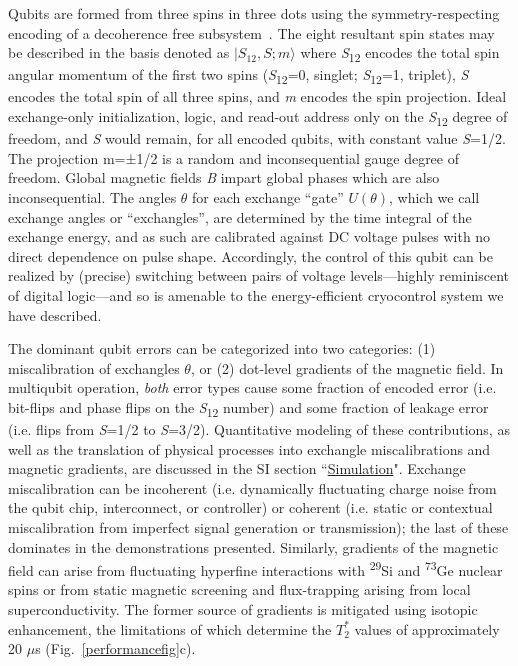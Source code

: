 \documentclass[aps,prl,twocolumn,superscriptaddress,nobibnotes,10pt,floatfix]{revtex4-2}
\newcommand{\figsubref}[2]{Fig.~\ref{#1}{#2}}
\begin{document}
	Qubits are formed from three spins in three dots using the symmetry-respecting encoding of a decoherence free subsystem~\cite{bacon_universal_2000,
		divincenzo_universal_2000,
		fong_universal_2011,
		langrock_reset-if-leaked_2020}.
	The eight resultant spin states may be described in the basis denoted as \(|S_{12},S;m\rangle\) where \emph{S}\textsubscript{12} encodes the total spin angular momentum of the first two spins (\emph{S}\textsubscript{12}=0, singlet; \emph{S}\textsubscript{12}=1, triplet), \emph{S} encodes the total spin of all three spins, and \emph{m} encodes the spin projection.
	Ideal exchange-only initialization, logic, and read-out address only on the \emph{S}\textsubscript{12} degree of freedom, and \emph{S} would remain, for all encoded qubits, with constant value \emph{S}=1/2.
	The projection m=±1/2 is a random and inconsequential gauge degree of freedom.
	Global magnetic fields \emph{B} impart global phases which are also inconsequential.
	The angles $\theta$ for each exchange ``gate'' $U(\theta)$, which we call exchange angles or ``exchangles'', are determined by the time integral of the exchange energy, and as such are calibrated against DC voltage pulses with no direct dependence on pulse shape.
	Accordingly, the control of this qubit can be realized by (precise) switching between pairs of voltage levels---highly reminiscent of digital logic---and so is amenable to the energy-efficient cryocontrol system we have described.

	The dominant qubit errors can be categorized into two categories: (1) miscalibration of exchangles $\theta$, or (2) dot-level gradients of the magnetic field.
	In multiqubit operation, \emph{both} error types cause some fraction of encoded error (i.e. bit-flips and phase flips on the \emph{S}\textsubscript{12} number) and some fraction of leakage error (i.e. flips from \emph{S}=1/2 to \emph{S}=3/2).
	Quantitative modeling of these contributions, as well as the translation of physical processes into exchangle miscalibrations and magnetic gradients, are discussed in the SI section ``\hyperref[simulation]{Simulation}".
	Exchange miscalibration can be incoherent (i.e. dynamically fluctuating charge noise from the qubit chip, interconnect, or controller) or coherent (i.e. static or contextual miscalibration from imperfect signal generation or transmission); the last of these dominates in the demonstrations presented.
	Similarly, gradients of the magnetic field can arise from fluctuating hyperfine interactions with \textsuperscript{29}Si and \textsuperscript{73}Ge nuclear spins or from static magnetic screening and flux-trapping arising from local superconductivity.
	The former source of gradients is mitigated using isotopic enhancement, the limitations of which determine the $T_2^*$ values of approximately 20 $\mu$s (\figsubref{performancefig}{c}).
\end{document}
